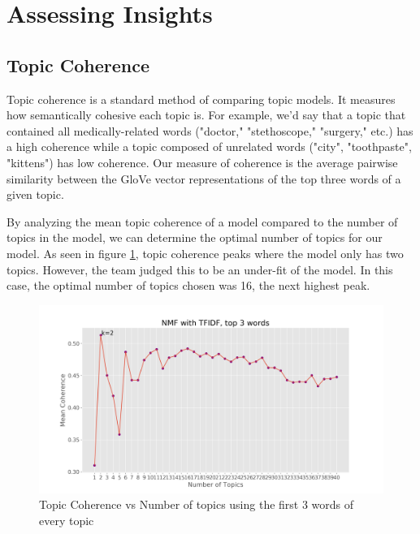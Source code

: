 \section{Assessing Insights}
\subsection{Topic Coherence}
Topic coherence is a standard method of comparing topic models. It measures how semantically cohesive each topic is. For example, we'd say that a topic that contained all medically-related words ("doctor," "stethoscope," "surgery," etc.) has a high coherence while a topic composed of unrelated words ("city", "toothpaste", "kittens") has low coherence. Our measure of coherence is the average pairwise similarity between the GloVe vector representations of the top three words of a given topic. 


By analyzing the mean topic coherence of a model compared to the number of topics in the model, we can determine the optimal number of topics for our model. As seen in figure \ref{fig:topic-coh}, topic coherence peaks where the model only has two topics. However, the team judged this to be an under-fit of the model. In this case, the optimal number of topics chosen was 16, the next highest peak. 
\begin{figure}[H]
    \centering
    \includegraphics[scale=0.15]{topiccoh.png}
    \caption{Topic Coherence vs Number of topics using the first 3 words of every topic}
    \label{fig:topic-coh}
\end{figure}

